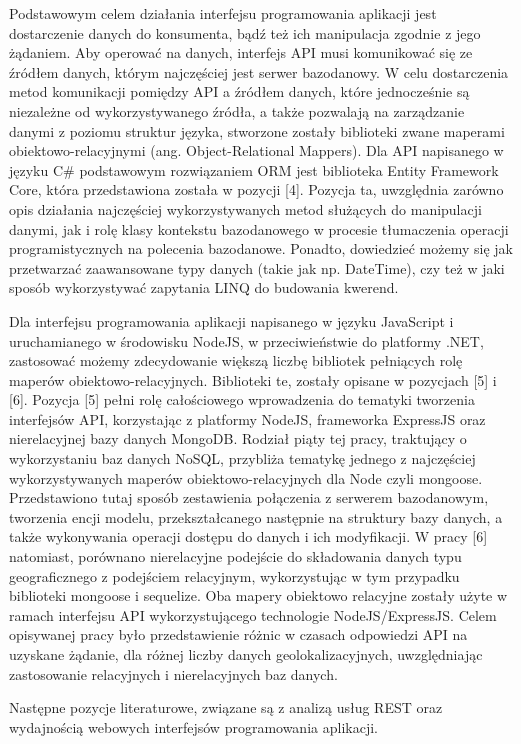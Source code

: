 Podstawowym celem działania interfejsu programowania aplikacji jest dostarczenie danych do konsumenta, bądź też ich manipulacja zgodnie z jego żądaniem. Aby operować na danych, interfejs API musi komunikować się ze źródłem danych, którym najczęściej jest serwer bazodanowy. W celu dostarczenia metod komunikacji pomiędzy API a źródłem danych, które jednocześnie są niezależne od wykorzystywanego źródła, a także pozwalają na zarządzanie danymi z poziomu struktur języka, stworzone zostały biblioteki zwane maperami obiektowo-relacyjnymi (ang. Object-Relational Mappers). Dla API napisanego w języku C\# podstawowym rozwiązaniem ORM jest biblioteka Entity Framework Core, która przedstawiona została w pozycji [4]. Pozycja ta, uwzględnia zarówno opis działania najczęściej wykorzystywanych metod służących do manipulacji danymi, jak i rolę klasy kontekstu bazodanowego w procesie tłumaczenia operacji programistycznych na polecenia bazodanowe. Ponadto, dowiedzieć możemy się jak przetwarzać zaawansowane typy danych (takie jak np. DateTime), czy też w jaki sposób wykorzystywać zapytania LINQ do budowania kwerend.

Dla interfejsu programowania aplikacji napisanego w języku JavaScript i uruchamianego w środowisku NodeJS, w przeciwieństwie do platformy .NET, zastosować możemy zdecydowanie większą liczbę bibliotek pełniących rolę maperów obiektowo-relacyjnych. Biblioteki te, zostały opisane w pozycjach [5] i [6]. Pozycja [5] pełni rolę całościowego wprowadzenia do tematyki tworzenia interfejsów API, korzystając z platformy NodeJS, frameworka ExpressJS oraz nierelacyjnej bazy danych MongoDB. Rodział piąty tej pracy, traktujący o wykorzystaniu baz danych NoSQL, przybliża tematykę jednego z najczęściej wykorzystywanych maperów obiektowo-relacyjnych dla Node czyli mongoose. Przedstawiono tutaj sposób zestawienia połączenia z serwerem bazodanowym, tworzenia encji modelu, przekształcanego następnie na struktury bazy danych, a także wykonywania operacji dostępu do danych i ich modyfikacji. W pracy [6] natomiast, porównano nierelacyjne podejście do składowania danych typu geograficznego z podejściem relacyjnym, wykorzystując w tym przypadku biblioteki mongoose i sequelize. Oba mapery obiektowo relacyjne zostały użyte w ramach interfejsu API wykorzystującego technologie NodeJS/ExpressJS. Celem opisywanej pracy było przedstawienie różnic w czasach odpowiedzi API na uzyskane żądanie, dla różnej liczby danych geolokalizacyjnych, uwzględniając zastosowanie relacyjnych i nierelacyjnych baz danych.

Następne pozycje literaturowe, związane są z analizą usług REST oraz wydajnością webowych interfejsów programowania aplikacji.

